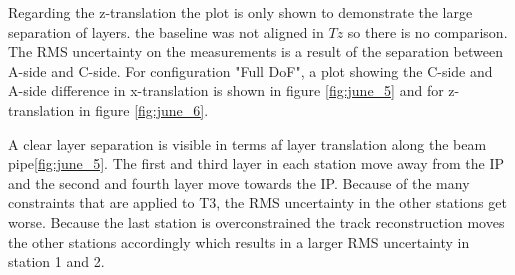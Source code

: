 Regarding the z-translation the plot is only shown to demonstrate the large separation of layers. the baseline was not aligned in $Tz$ so there is no comparison.
The RMS uncertainty on the measurements is a result of the separation between A-side and C-side. For configuration "Full DoF", a plot showing the C-side and A-side difference in x-translation is shown in figure \ref{fig:june_5} and for z-translation in figure \ref{fig:june_6}.



A clear layer separation is visible in terms af layer translation along the beam pipe\ref{fig:june_5}.
The first and third layer in each station move away from the IP and the second and
fourth layer move towards the IP.
Because of the many constraints that are applied to T3, the RMS uncertainty in the other stations get worse. Because the last station is overconstrained the track reconstruction moves the other stations accordingly which results in a larger RMS uncertainty in station 1 and 2.

